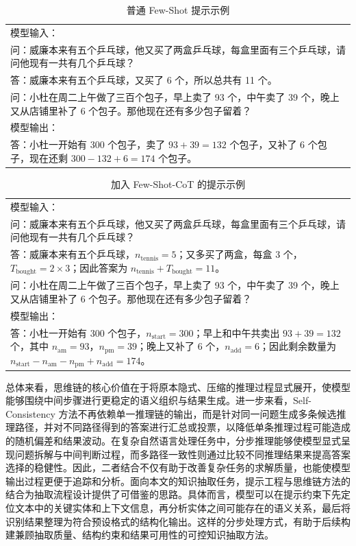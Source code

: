\begin{table}[htbp]
  \centering
  \caption{普通 Few-Shot 提示示例}
  \label{tab:few_shot_plain}
  {\small
  \begin{tabular}{p{}}
    \toprule
    模型输入：\\
    问：威廉本来有五个乒乓球，他又买了两盒乒乓球，每盒里面有三个乒乓球，请问他现有一共有几个乒乓球？\\
    答：威廉本来有五个乒乓球，又买了 6 个，所以总共有 11 个。\\
    问：小杜在周二上午做了三百个包子，早上卖了 93 个，中午卖了 39 个，晚上又从店铺里补了 6 个包子。那他现在还有多少包子留着？\\[4pt]
    模型输出：\\
    答：小杜一开始有 300 个包子，卖了 $93+39=132$ 个包子，又补了 6 个包子，现在还剩 $300-132+6=174$ 个包子。\\
    \bottomrule
  \end{tabular}}
\end{table}

\begin{table}[htbp]
  \centering
  \caption{加入 Few-Shot-CoT 的提示示例}
  \label{tab:few_shot_cot}
  {\small
  \begin{tabular}{p{}}
    \toprule
    模型输入：\\
    问：威廉本来有五个乒乓球，他又买了两盒乒乓球，每盒里面有三个乒乓球，请问他现有一共有几个乒乓球？\\
    答：威廉本来有五个乒乓球，$n_{\text{tennis}}=5$；又多买了两盒，每盒 3 个，$T_{\text{bought}}=2\times 3$；因此答案为
    $n_{\text{tennis}}+T_{\text{bought}}=11$。\\
    问：小杜在周二上午做了三百个包子，早上卖了 93 个，中午卖了 39 个，晚上又从店铺里补了 6 个包子。那他现在还有多少包子留着？\\[4pt]
    模型输出：\\
    答：小杜一开始有 300 个包子，$n_{\text{start}}=300$；早上和中午共卖出 $93+39=132$ 个，其中 $n_{\text{am}}=93$，$n_{\text{pm}}=39$；晚上又补了 6 个，$n_{\text{add}}=6$；因此剩余数量为
    $n_{\text{start}}-n_{\text{am}}-n_{\text{pm}}+n_{\text{add}}=174$。\\
    \bottomrule
  \end{tabular}}
\end{table}

总体来看，思维链的核心价值在于将原本隐式、压缩的推理过程显式展开，使模型能够围绕中间步骤进行更稳定的语义组织与结果生成。进一步来看，Self-Consistency 方法不再依赖单一推理链的输出，而是针对同一问题生成多条候选推理路径，并对不同路径得到的答案进行汇总或投票，以降低单条推理过程可能造成的随机偏差和结果波动\cite{Wang2023SelfConsistency}。在复杂自然语言处理任务中，分步推理能够使模型显式呈现问题拆解与中间判断过程，而多路径一致性则通过比较不同推理结果来提高答案选择的稳健性。因此，二者结合不仅有助于改善复杂任务的求解质量，也能使模型输出过程更便于追踪和分析。面向本文的知识抽取任务，提示工程与思维链方法的结合为抽取流程设计提供了可借鉴的思路。具体而言，模型可以在提示约束下先定位文本中的关键实体和上下文信息，再分析实体之间可能存在的语义关系，最后将识别结果整理为符合预设格式的结构化输出。这样的分步处理方式，有助于后续构建兼顾抽取质量、结构约束和结果可用性的可控知识抽取方法。


